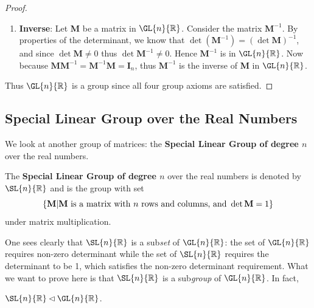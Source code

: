 \begin{proof}
\begin{enumerate}
        \item \textbf{Inverse}: Let \textbf{M} be a matrix in $\GL{n}{\mathbb{R}}$. Consider the matrix $\textbf{M}^{-1}$. By properties of the determinant, we know that $\det \left(\textbf{M}^{-1}\right) = \left(\det \textbf{M}\right)^{-1}$, and since $\det \textbf{M} \neq 0$ thus $\det \textbf{M}^{-1} \neq 0$. Hence $\textbf{M}^{-1}$ is in $\GL{n}{\mathbb{R}}$. Now because $\textbf{MM}^{-1} = \textbf{M}^{-1}\textbf{M} = \textbf{I}_n$, thus $\textbf{M}^{-1}$ is the inverse of \textbf{M} in $\GL{n}{\mathbb{R}}$.
    \end{enumerate}
    Thus $\GL{n}{\mathbb{R}}$ is a group since all four group axioms are satisfied.
\end{proof}

\subsection{Special Linear Group over the Real Numbers}
We look at another group of matrices: the \textbf{Special Linear Group of degree $n$} over the real numbers.
\begin{definition}
    The \textbf{Special Linear Group of degree $n$} over the real numbers is denoted by $\SL{n}{\mathbb{R}}$ and is the group with set
    \[
        \left\{\textbf{M} \vert \text{\textbf{M} is a matrix with } n \text{ rows and columns, and } \det \textbf{M} = 1\right\}
    \]
    under matrix multiplication.
\end{definition}
One sees clearly that $\SL{n}{\mathbb{R}}$ is a sub\textit{set} of $\GL{n}{\mathbb{R}}$: the set of $\GL{n}{\mathbb{R}}$ requires non-zero determinant while the set of $\SL{n}{\mathbb{R}}$ requires the determinant to be 1, which satisfies the non-zero determinant requirement. What we want to prove here is that $\SL{n}{\mathbb{R}}$ is a sub\textit{group} of $\GL{n}{\mathbb{R}}$. In fact,
\begin{proposition}
    $\SL{n}{\mathbb{R}} \lhd \GL{n}{\mathbb{R}}$.
\end{proposition}
